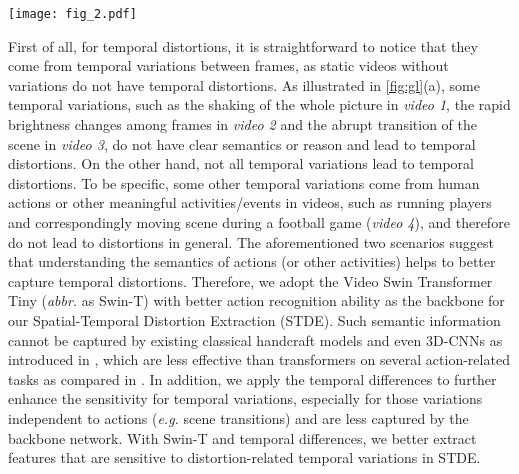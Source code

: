 \documentclass[journal]{IEEEtran}
\begin{document}
\begin{figure*}
    \centering
\texttt{[image: fig\_2.pdf]}
    \caption{Examples for naturally collected videos in LSVQ dataset\cite{pvq} show complicated temporal relationships and their effects to VQA. These effects have shown that better temporal modeling are in need for VQA task.}
    \label{fig:gl}
\end{figure*}








First of all, for temporal distortions, it is straightforward to notice that they come from temporal variations between frames, as static videos without variations do not have temporal distortions. As illustrated in \cref{fig:gl}(a), some temporal variations, such as the shaking of the whole picture in \textit{video 1}, the rapid brightness changes among frames in \textit{video 2} and the abrupt transition of the scene in \textit{video 3}, do not have clear semantics or reason and lead to temporal distortions.  On the other hand, not all temporal variations lead to temporal distortions. To be specific, some other temporal variations come from human actions or other meaningful activities/events in videos, such as running players and correspondingly moving scene during a football game (\textit{video 4}), and therefore do not lead to distortions in general. 
The aforementioned two scenarios suggest that understanding the semantics of actions (or other activities) helps to better capture temporal distortions. Therefore, we adopt the Video Swin Transformer Tiny (\textit{abbr.} as Swin-T) with better action recognition ability as the backbone for our Spatial-Temporal Distortion Extraction (STDE). Such semantic information cannot be captured by existing classical handcraft models \cite{tlvqm, videval, vbliinds} and even 3D-CNNs \cite{k400, r3d, c3d} as introduced in \cite{cnn+lstm, pvq}, which are less effective than transformers on several action-related tasks as compared in \cite{timesformer,mvit,swin3d}. In addition, we apply the temporal differences to further enhance the sensitivity for temporal variations, especially for those variations independent to actions (\textit{e.g.} scene transitions) and are less captured by the backbone network. With Swin-T and temporal differences, we better extract features that are sensitive to distortion-related temporal variations in STDE.
\end{document}
